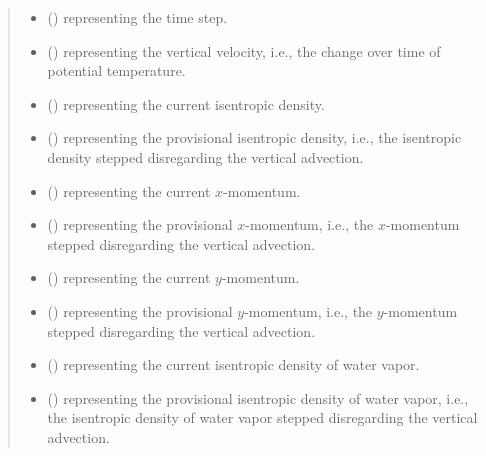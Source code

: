 \documentclass[letterpaper,10pt,english]{sphinxmanual}
\begin{document}
\begin{fulllineitems}
\begin{fulllineitems}
\begin{quote}
\begin{description}
\begin{itemize}
\item {} 
 () \textendash{}  representing the time step.

\item {} 
 () \textendash{}  representing the vertical velocity,
i.e., the change over time of potential temperature.

\item {} 
 () \textendash{}  representing the current isentropic density.

\item {} 
 () \textendash{}  representing the provisional isentropic density,
i.e., the isentropic density stepped disregarding the vertical advection.

\item {} 
 () \textendash{}  representing the current \(x\)-momentum.

\item {} 
 () \textendash{}  representing the provisional \(x\)-momentum,
i.e., the \(x\)-momentum stepped disregarding the vertical advection.

\item {} 
 () \textendash{}  representing the current \(y\)-momentum.

\item {} 
 () \textendash{}  representing the provisional \(y\)-momentum,
i.e., the \(y\)-momentum stepped disregarding the vertical advection.

\item {} 
 () \textendash{}  representing the current isentropic density of water vapor.

\item {} 
 () \textendash{}  representing the provisional isentropic density of water vapor,
i.e., the isentropic density of water vapor stepped disregarding the vertical advection.


\end{itemize}
\end{description}
\end{quote}
\end{fulllineitems}
\end{fulllineitems}
\end{document}
